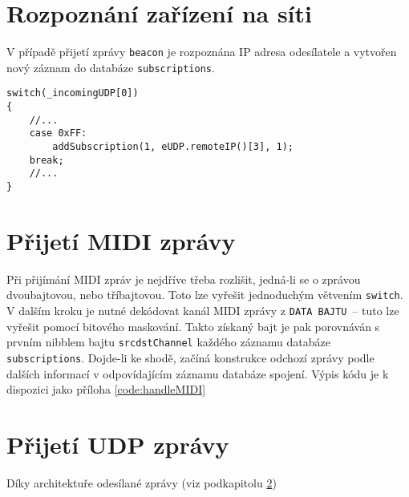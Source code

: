 \section{Rozpoznání zařízení na síti}
V případě přijetí zprávy \texttt{beacon} je rozpoznána IP adresa odesílatele a vytvořen nový záznam do databáze \texttt{sub\-scrip\-tions}. 

\begin{lstlisting}
switch(_incomingUDP[0])
{
    //...
    case 0xFF:
        addSubscription(1, eUDP.remoteIP()[3], 1);
    break;
    //...
}
\end{lstlisting}

\section{Přijetí \acs{MIDI} zprávy}\label{chpt:PrijMIDI}
Při přijímání \acs{MIDI} zpráv je nejdříve třeba rozlišit, jedná-li se o zprávou dvoubajtovou, nebo tříbajtovou. Toto lze vyřešit jednoduchým větvením \texttt{switch}. V dalším kroku je nutné dekódovat kanál \acs{MIDI} zprávy z \texttt{DATA BAJTU}~-- tuto  lze vyřešit pomocí bitového maskování. Takto získaný bajt je pak porovnáván s prvním nibblem bajtu \texttt{srcdstChannel} každého záznamu databáze \texttt{sub\-scrip\-tions}. Dojde-li ke shodě, začíná konstrukce odchozí zprávy podle dalších informací v odpovídajícím záznamu databáze spojení. Výpis kódu je k dispozici jako příloha \ref{code:handleMIDI}

\section{Přijetí UDP zprávy}
Díky architektuře odesílané zprávy (viz podkapitolu \ref{chpt:PrijMIDI})



